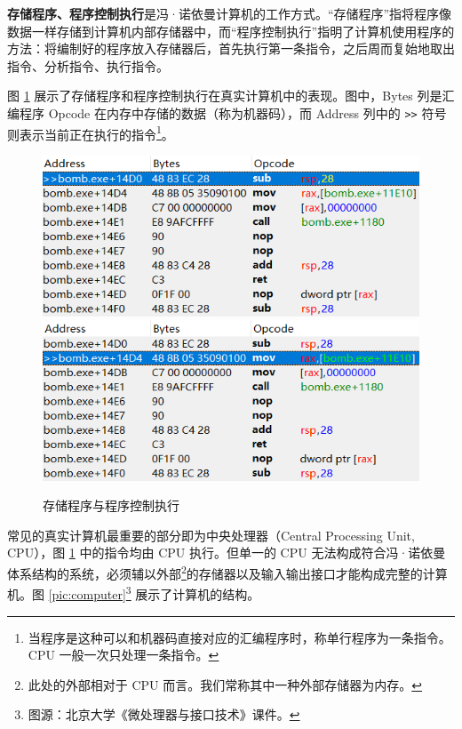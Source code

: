\textbf{存储程序、程序控制执行}是冯·诺依曼计算机的工作方式。“存储程序”指将程序像数据一样存储到计算机内部存储器中，而“程序控制执行”指明了计算机使用程序的方法：将编制好的程序放入存储器后，首先执行第一条指令，之后周而复始地取出指令、分析指令、执行指令。

图 \ref{pic:asm} 展示了存储程序和程序控制执行在真实计算机中的表现。图中，Bytes 列是汇编程序 Opcode 在内存中存储的数据（称为机器码），而 Address 列中的 \lstinline{>>} 符号则表示当前正在执行的指令\footnote{当程序是这种可以和机器码直接对应的汇编程序时，称单行程序为一条指令。CPU 一般一次只处理一条指令。}。

\begin{figure}[ht]
	\centering
	\includegraphics[width=0.75\linewidth]{pic/asm-1.png}
	\includegraphics[width=0.75\linewidth]{pic/asm-2.png}
	\caption{存储程序与程序控制执行}
	\label{pic:asm}
\end{figure}

常见的真实计算机最重要的部分即为中央处理器（Central Processing Unit, CPU），图 \ref{pic:asm} 中的指令均由 CPU 执行。但单一的 CPU 无法构成符合冯·诺依曼体系结构的系统，必须辅以外部\footnote{此处的外部相对于 CPU 而言。我们常称其中一种外部存储器为内存。}的存储器以及输入输出接口才能构成完整的计算机。图 \ref{pic:computer}\footnote{图源：北京大学《微处理器与接口技术》课件。} 展示了计算机的结构。

